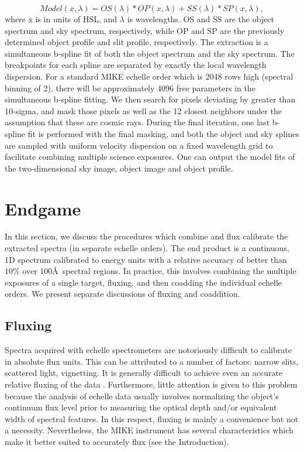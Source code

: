 \documentclass[12pt,preprint]{aastex}
\begin{document}
\begin{equation}
Model(x,\lambda)= OS(\lambda) * OP(x,\lambda)+ SS(\lambda) * SP(x,\lambda),
\end{equation}
where x is in units of HSL, and $\lambda$ is wavelengths.  OS and SS are the
object spectrum and sky spectrum, respectively, while OP and SP are the 
previously determined object profile and slit profile, respectively.
The extraction is a simultaneous b-spline fit of both the object spectrum and
the sky spectrum.  The breakpoints for each spline are separated by exactly
the local wavelength dispersion. For a standard MIKE echelle order
which is 2048 rows high (spectral binning of 2), there will be approximately
4096 free parameters in the simultaneous b-spline fitting.  
We then search for pixels deviating by greater than 10-sigma, and mask those
pixels as well as the 12 closest neighbors
under the assumption that these are cosmic rays.
During the final iteration, one last b-spline fit is performed with the final
masking, and both the object and sky splines are sampled with uniform 
velocity dispersion on a fixed wavelength grid to facilitate 
combining multiple science exposures.  One can output
the model fits of the two-dimensional sky image,
 object image and object profile. 

 
\section{Endgame}
\label{sec:endgame}

In this section, we discuss the procedures which combine and 
flux calibrate the extracted spectra (in separate echelle orders).
The end product is a continuous, 1D spectrum calibrated to 
energy units with a relative accuracy of better than $10\%$ over
100\AA\ spectral regions.
In practice, this involves combining the 
multiple exposures of a single target, fluxing, and then 
coadding the individual echelle orders.  We present separate
discussions of fluxing and coaddition.

\subsection{Fluxing}

Spectra acquired with echelle spectrometers are notoriously
difficult to calibrate in absolute flux units.
This can be attributed to a number of factors:  narrow slits,
scattered light, vignetting.
It is generally difficult to achieve even
an accurate relative fluxing of the data \citep[e.g.][]{dh,elp+99,suzuki}.
Furthermore, little attention is given to this problem
because the analysis of echelle data usually involves
normalizing the object's continuum flux level prior
to measuring the optical depth and/or equivalent width of spectral
features.  In this respect, fluxing is mainly a convenience but
not a necessity.  Nevertheless, the MIKE instrument has several
characteristics which make it better suited to accurately flux (see the
Introduction). 
\end{document}
